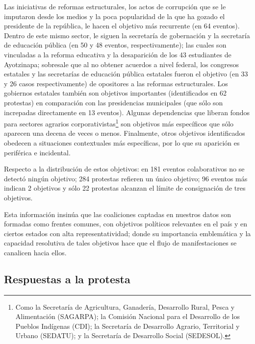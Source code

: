 \documentclass[letterpaper, 11pt]{book}
\theoremstyle{definition}
\theoremstyle{remark}
\begin{document}
Las iniciativas de reformas estructurales, los actos de corrupción que se le imputaron desde los medios y la poca popularidad de la que ha gozado el presidente de la república, le hacen el objetivo más recurrente (en 64 eventos). 
Dentro de este mismo sector, le siguen la secretaría de gobernación y la secretaría de educación pública (en 50 y 48 eventos, respectivamente); las cuales son vinculadas a la reforma educativa y la desaparición de los 43 estudiantes de Ayotzinapa; sobresale que al no obtener acuerdos a nivel federal, los congresos estatales y las secretarías de educación pública estatales fueron el objetivo (en 33 y 26 casos respectivamente) de opositores a las reformas estructurales. 
Los gobiernos estatales también son objetivos importantes (identificados en 62 protestas) en comparación con las presidencias municipales (que sólo son increpadas directamente en 13 eventos). 
Algunas dependencias que liberan fondos para sectores agrarios corporativistas\footnote{
    Como la Secretaría de Agricultura, Ganadería, Desarrollo Rural, Pesca y Alimentación (SAGARPA); la Comisión Nacional para el Desarrollo de los Pueblos Indígenas (CDI); la Secretaría de Desarrollo Agrario, Territorial y Urbano (SEDATU); y la Secretaría de Desarrollo Social (SEDESOL). 
} 
son objetivos más específicos que sólo aparecen una decena de veces o menos. 
Finalmente, otros objetivos identificados obedecen a situaciones contextuales más específicas, por lo que su aparición es periférica e incidental. 


Respecto a la distribución de estos objetivos: en 181 eventos colaborativos no se detectó ningún objetivo; 284 protestas refieren un único objetivo; 96 eventos más indican 2 objetivos y sólo 22 protestas alcanzan el límite de consignación de tres objetivos. 


Esta información insinúa que las coaliciones captadas en nuestros datos son formadas como frentes comunes, con objetivos políticos relevantes en el país y en ciertos estados con alta representatividad; donde su importancia emblemática y la capacidad resolutiva de tales objetivos hace que el flujo de manifestaciones se canalicen hacia ellos. 




\subsection{Respuestas a la protesta}
\label{sec:respuestaProtesta}
\end{document}
